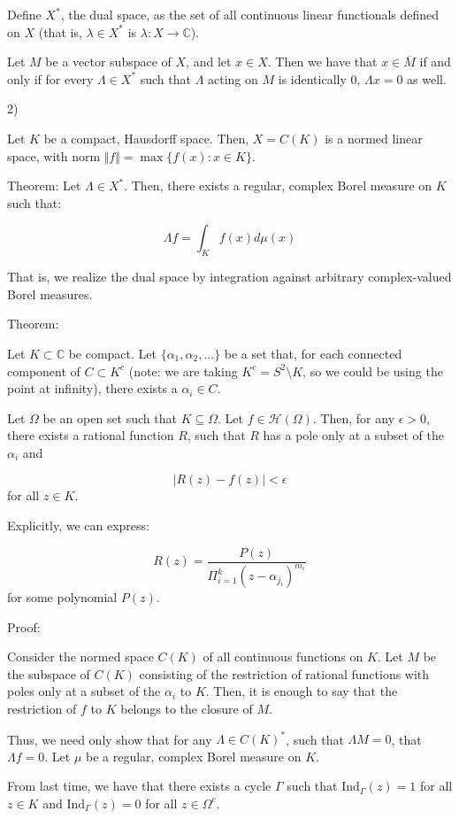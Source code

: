 \documentclass[10pt]{article}
\newcommand{\calH}{\mathcal{H}}
\newcommand{\ind}{\text{Ind}}
\begin{document}
Define $X^*$, the dual space, as the set of all continuous linear functionals defined on $X$ (that is, $\lambda \in X^*$ is $\lambda: X \to \mathbb{C}$).

Let $M$ be a vector subspace of $X$, and let $x \in X$. Then we have that $x \in \overline{M}$ if and only if for every $\Lambda \in X^*$ such that $\Lambda$ acting on $M$ is identically 0, $\Lambda x = 0$ as well.

2)

Let $K$ be a compact, Hausdorff space. Then, $X = C(K)$ is a normed linear space, with norm $\Vert f \Vert = \max \{ f(x) : x \in K \}$. 

Theorem: Let $ \Lambda \in X^*$. Then, there exists a regular, complex Borel measure on $K$ such that:

$$ \Lambda f = \int_K f(x) d\mu(x) $$

That is, we realize the dual space by integration against arbitrary complex-valued Borel measures.

Theorem:

Let $K \subset \mathbb{C}$ be compact. Let $\{ \alpha_1, \alpha_2,... \}$ be a set that, for each connected component of $C \subset K^c$ (note: we are taking $K^c = S^2 \setminus K$, so we could be using the point at infinity), there exists a $\alpha_i \in C$.

Let $\Omega$ be an open set such that $K \subseteq \Omega$. Let $f \in \calH(\Omega)$. Then, for any $\epsilon > 0$, there exists a rational function $R$, such that $R$ has a pole only at a subset of the $\alpha_i$ and

$$ |R(z) - f(z) |< \epsilon $$ for all $z \in K$.

Explicitly, we can express:

$$R(z) = \frac{P(z)}{\Pi_{i=1}^k (z- \alpha_{j_i})^{m_i}} $$ for some polynomial $P(z)$.

Proof:

Consider the normed space $C(K)$ of all continuous functions on $K$. Let $M$ be the subspace of $C(K)$ consisting of the restriction of rational functions with poles only at a subset of the $\alpha_i$ to $K$. Then, it is enough to say that the restriction of $f$ to $K$ belongs to the closure of $M$.

Thus, we need only show that for any $\Lambda \in C(K)^*$, such that $\Lambda M = 0$, that $\Lambda f = 0$. Let $\mu$ be a regular, complex Borel measure on $K$.

From last time, we have that there exists a cycle $\Gamma$ such that $\ind_\Gamma(z) = 1$ for all $z \in K$ and $\ind_\Gamma(z) = 0$ for all $z \in \Omega^c$.
\end{document}
